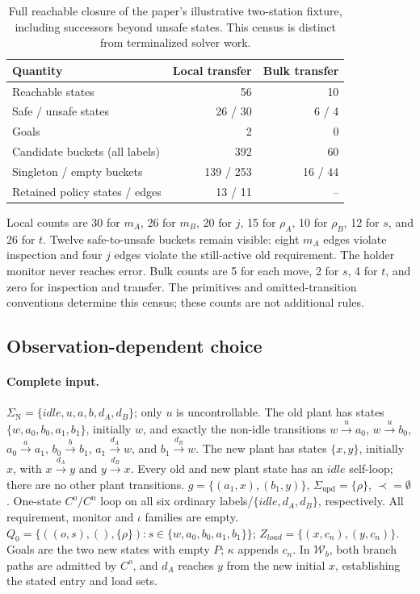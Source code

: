 \documentclass[11pt]{article}
\newcommand{\SigmaU}{\Sigma_{\mathrm{upd}}}
\begin{document}
\begin{table}[ht]
\centering\small
\caption{Full reachable closure of the paper's illustrative two-station fixture, including successors beyond unsafe states. This census is distinct from terminalized solver work.}
\begin{tabular}{@{}lrr@{}}
\toprule
Quantity & Local transfer & Bulk transfer\\
\midrule
Reachable states & 56 & 10\\
Safe / unsafe states & 26 / 30 & 6 / 4\\
Goals & 2 & 0\\
Candidate buckets (all labels) & 392 & 60\\
Singleton / empty buckets & 139 / 253 & 16 / 44\\
Retained policy states / edges & 13 / 11 & --\\
\bottomrule
\end{tabular}
\end{table}
Local counts are 30 for $m_A$, 26 for $m_B$, 20 for $j$, 15 for $\rho_A$, 10 for $\rho_B$, 12 for $s$, and 26 for $t$. Twelve safe-to-unsafe buckets remain visible: eight $m_A$ edges violate inspection and four $j$ edges violate the still-active old requirement. The holder monitor never reaches error. Bulk counts are 5 for each move, 2 for $s$, 4 for $t$, and zero for inspection and transfer. The primitives and omitted-transition conventions determine this census; these counts are not additional rules.

\subsection{Observation-dependent choice}
\paragraph{Complete input.}
$\Sigma_{\mathrm{N}}=\{idle,u,a,b,d_A,d_B\}$; only $u$ is uncontrollable.
The old plant has states $\{w,a_0,b_0,a_1,b_1\}$, initially $w$, and exactly the non-idle transitions
$w\xrightarrow{u}a_0$, $w\xrightarrow{u}b_0$, $a_0\xrightarrow{a}a_1$, $b_0\xrightarrow{b}b_1$, $a_1\xrightarrow{d_A}w$, and $b_1\xrightarrow{d_B}w$.
The new plant has states $\{x,y\}$, initially $x$, with $x\xrightarrow{d_A}y$ and $y\xrightarrow{d_B}x$.
Every old and new plant state has an $idle$ self-loop; there are no other plant transitions.
$g=\{(a_1,x),(b_1,y)\}$, $\SigmaU=\{\rho\}$, $\prec=\emptyset$.
One-state $C^o/C^n$ loop on all six ordinary labels/$\{idle,d_A,d_B\}$, respectively.
All requirement, monitor and $\iota$ families are empty.
$Q_0=\{((o,s),(),\{\rho\}):s\in\{w,a_0,b_0,a_1,b_1\}\}$;
$Z_{load}=\{(x,c_n),(y,c_n)\}$. Goals are the two new states with empty $P$; $\kappa$ appends $c_n$.
In $\mathcal W_b$, both branch paths are admitted by $C^o$, and $d_A$ reaches $y$ from the new initial $x$, establishing the stated entry and load sets.
\end{document}
